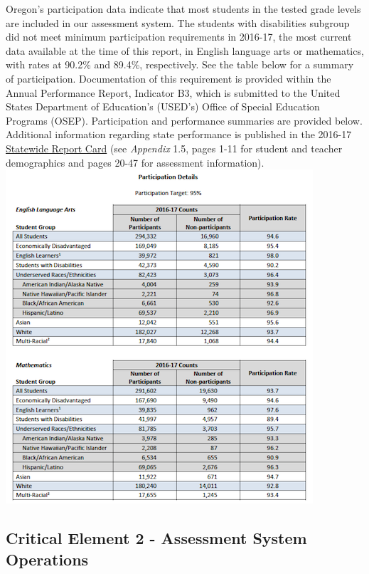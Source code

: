 \documentclass[]{article}
\begin{document}
Oregon's participation data indicate that most students in the tested
grade levels are included in our assessment system. The students with
disabilities subgroup did not meet minimum participation requirements in
2016-17, the most current data available at the time of this report, in
English language arts or mathematics, with rates at 90.2\% and 89.4\%,
respectively. See the table below for a summary of participation.
Documentation of this requirement is provided within the Annual
Performance Report, Indicator B3, which is submitted to the United
States Department of Education's (USED's) Office of Special Education
Programs (OSEP). Participation and performance summaries are provided
below. Additional information regarding state performance is published
in the 2016-17
\color{link}\href{http://www.oregon.gov/ode/schools-and-districts/reportcards/Documents/rptcard2017.pdf}{Statewide
Report Card} \color{black} (see \emph{Appendix} 1.5, pages 1-11 for
student and teacher demographics and pages 20-47 for assessment
information).\FloatBarrier
\includegraphics{Figures/Participation/Participation.png}

\subsection{Critical Element 2 - Assessment System
Operations}\label{critical-element-2---assessment-system-operations}
\end{document}
